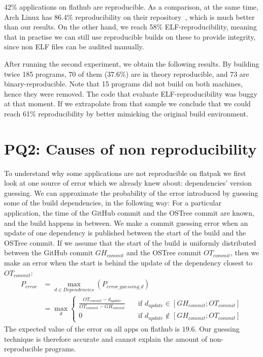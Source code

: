 \documentclass[a4paper,11pt,oneside]{report}
\theoremstyle{definition}
\newcommand{\rb}{reproducible builds\xspace}
\newcommand{\fp}{flatpak\xspace}
\newcommand{\fh}{flathub\xspace}
\newcommand{\ot}{OSTree\xspace}
\begin{document}
42\% applications on \fh are reproducible. As a comparison, at the same time,
Arch Linux has 86.4\% reproducibility on their
repository~\cite{arch-rebuilderd}, which is much better than our results. On
the other hand, we reach 58\% ELF-reproducibility, meaning that in practise we
can still use \rb on these to provide integrity, since non ELF files can be
audited manually.

\label{sec:theo-repro}
After running the second experiment, we obtain the following results. By
building twice 185 programs, 70 of them (37.6\%) are in theory reproducible,
and 73 are binary-reproducible. Note that 15 programs did not build on both
machines, hence they were removed. The code that evaluate ELF-reproducibility
was buggy at that moment. If we extrapolate from that sample we conclude that
we could reach 61\% reproducibility by better mimicking the original build
environment.


\section{PQ2: Causes of non reproducibility}
\label{sec:pq2}

To understand why some applications are not reproducible on \fp we first look
at one source of error which we already knew about: dependencies' version
guessing. We can approximate the probability of the error introduced by
guessing some of the build dependencies, in the following way: For a particular
application, the time of the GitHub commit and the \ot commit are known, and the
build happens in between. We make a commit guessing error when an update of one
dependency is published between the start of the build and the \ot commit. If
we assume that the start of the build is uniformly distributed between the
GitHub commit $GH_{commit}$ and the \ot commit $OT_{commit}$, then we make an
error when the start is behind the update of the dependency closest to
$OT_{commit}$:
\begin{align*}
    P_{error} &= \max_{d \in Dependencies}(P_{error\_guessing\_d}) \\
              &= \max_{d}
              \begin{cases}
                \frac{OT_{commit} - d_{update}}{OT_{commit} -
                    GH_{commit}}  & \quad \text{if } d_{update}
                    \in [GH_{commit}; OT_{commit}] \\
                0  & \quad \text{if } d_{update}
                  \notin [GH_{commit}; OT_{commit}]
              \end{cases}
\end{align*}
The expected value of the error on all apps on \fh is $19.6$. Our guessing
technique is therefore accurate and cannot explain the amount of
non-reproducible programs.
\end{document}
